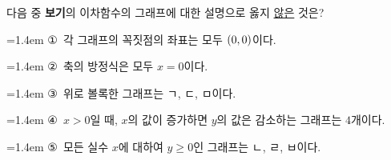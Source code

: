 다음 중 \textbf{보기}의 이차함수의 그래프에 대한 설명으로 옳지 \underline{않은} 것은?
\par\medskip\par\noindent\hangindent=1.4em {\small ①}\ 각 그래프의 꼭짓점의 좌표는 모두 $(0{,}\mkern3mu 0)$이다.\par\noindent\hangindent=1.4em {\small ②}\ 축의 방정식은 모두 $x=0$이다.\par\noindent\hangindent=1.4em {\small ③}\ 위로 볼록한 그래프는 ㄱ, ㄷ, ㅁ이다.\par\noindent\hangindent=1.4em {\small ④}\ $x>0$일 때, $x$의 값이 증가하면 $y$의 값은 감소하는 그래프는 $4$개이다.\par\noindent\hangindent=1.4em {\small ⑤}\ 모든 실수 $x$에 대하여 $y\ge 0$인 그래프는 ㄴ, ㄹ, ㅂ이다.\par\medskip

